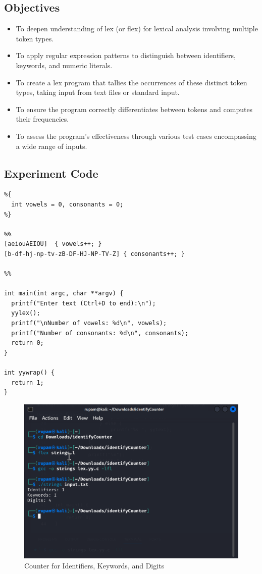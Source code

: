 \documentclass[12pt]{article}
\begin{document}
\subsection*{Objectives}
\begin{itemize}
    \item To deepen understanding of lex (or flex) for lexical analysis involving multiple token types.
    \item To apply regular expression patterns to distinguish between identifiers, keywords, and numeric literals.
    \item To create a lex program that tallies the occurrences of these distinct token types, taking input from text files or standard input.
    \item To ensure the program correctly differentiates between tokens and computes their frequencies.
    \item To assess the program's effectiveness through various test cases encompassing a wide range of inputs.
\end{itemize}

\subsection*{Experiment Code}
\begin{lstlisting}
%{
  int vowels = 0, consonants = 0;
%}

%%
[aeiouAEIOU]  { vowels++; }
[b-df-hj-np-tv-zB-DF-HJ-NP-TV-Z] { consonants++; }

%%

int main(int argc, char **argv) {
  printf("Enter text (Ctrl+D to end):\n");
  yylex();
  printf("\nNumber of vowels: %d\n", vowels);
  printf("Number of consonants: %d\n", consonants);
  return 0;
}

int yywrap() {
  return 1;
}
\end{lstlisting}
\begin{figure}[H]
    \centering
    \includegraphics[width=1\linewidth]{exp12output.png}
    \caption{Counter for Identifiers, Keywords, and Digits}
\end{figure}
\end{document}
